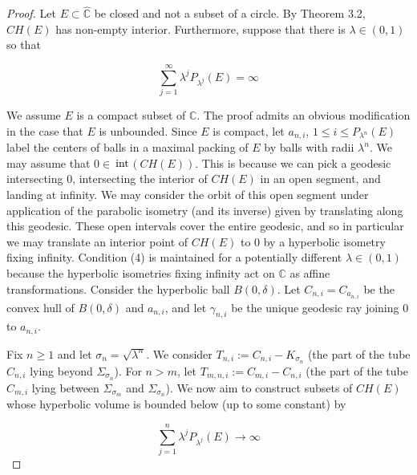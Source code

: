 \documentclass[11pt]{article}
\newcommand\comp{{\mathbb{C}}}
\begin{document}
    \begin{proof} Let $E \subset \hat{\comp}$ be closed and not a subset of a circle. By Theorem 3.2, $CH(E)$ has non-empty interior. Furthermore, suppose that there is $\lambda \in (0,1)$ so that 
    
$$\sum_{j=1}^\infty \lambda^j P_{\lambda^j}(E) = \infty $$

    We assume $E$ is a compact subset of $\comp$. The proof admits an obvious modification in the case that $E$ is unbounded. Since $E$ is compact, let $a_{n,i}$, $1 \leq i \leq P_{\lambda^n}(E)$ label the centers of balls in a maximal packing of $E$ by balls with radii $\lambda^n$. We may assume that $0 \in \ $$
    \rm{int}$$(CH(E))$. This is because we can pick a geodesic intersecting $0$, intersecting the interior of $CH(E)$ in an open segment, and  landing at infinity. We may consider the orbit of this open segment under application of the parabolic isometry (and its inverse) given by translating along this geodesic. These open intervals cover the entire geodesic, and so in particular we may translate an interior point of $CH(E)$ to $0$ by a hyperbolic isometry fixing infinity.  Condition (4) is maintained for a potentially different $\lambda \in (0,1)$ because the hyperbolic isometries fixing infinity act on $\comp$ as affine transformations.  Consider the hyperbolic ball $B(0, \delta)$. Let $C_{n,i} = C_{a_{n,i}}$ be the convex hull of $B(0, \delta)$ and $a_{n,i}$, and let $\gamma_{n,i}$ be the unique geodesic ray joining $0$ to $a_{n,i}$. 

    
    \bigskip

    Fix $n \geq 1$ and let $\sigma_n = \sqrt{\lambda^n}$. We consider $T_{n,i} := C_{n,i} - K_{\sigma_n}$ (the part of the tube $C_{n,i}$ lying beyond $\Sigma_{\sigma_n}$). For $n > m$, let  $T_{m,n,i} := C_{m,i} - C_{n,i}$ (the part of the tube $C_{m,i}$ lying between $\Sigma_{\sigma_m}$ and $\Sigma_{\sigma_n}$). We now aim to construct subsets of $CH(E)$ whose hyperbolic volume is bounded below (up to some constant) by 

    $$ \sum_{j=1}^n \lambda^j P_{\lambda^j}(E) \rightarrow  \infty$$ 
    

\end{proof}
\end{document}
